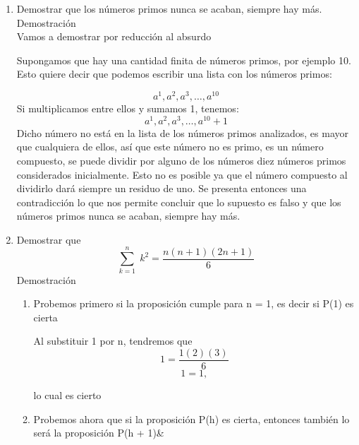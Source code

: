 \documentclass{article}
\begin{document}
\begin {enumerate}
Demostración

Vamos a demostrar por reducción al absurdo
\\ 

Supongamos que un peón puede moverse 7 pasos como mínimo en el juego. Esto haría que el juego tenga 9 filas como mínimo.
Sabemos que el tablero tiene 8 filas, entonces, se presenta una contradicción, es decir, que lo supuesto es falso; es decir, un peón puede moverse a lo sumo seis pasos
\item
Demostrar que los números primos  nunca se acaban, siempre hay más.
\\ 

Demostración
\\ 

Vamos a demostrar por reducción al absurdo

Supongamos que hay una cantidad finita de números primos, por ejemplo 10. Esto quiere decir que podemos escribir una lista con los números primos: 

$$a^1, a^2, a^3,, a^{10}$$
Si multiplicamos entre ellos y sumamos 1, tenemos: 
$$a^1, a^2, a^3,, a^10 + 1$$
Dicho número no está en la lista de los números primos analizados, es mayor que cualquiera de ellos, así que este número no es primo, es un número compuesto, se puede dividir por alguno de los números diez números primos considerados inicialmente.  Esto no es
posible ya que el número compuesto al  dividirlo dará siempre un residuo de uno. Se presenta entonces una contradicción lo que nos permite concluir que lo supuesto es falso y que los números primos nunca se acaban, siempre hay más.
\item
Demostrar que 
\begin {equation}
\label {pregunta 30 ec 7}
\displaystyle \sum_{k=1}^{n} \; k^2 = \frac{n(n+1)(2n+1)}{6}
\end{equation}
Demostración
\begin {enumerate}
\item
Probemos primero si la proposición cumple para n = 1, es decir si P(1) es cierta

Al substituir 1 por n, tendremos que
$$1 = \frac{1(2)(3)}{6}$$
$$1 = 1, $$

lo cual es cierto 
\item
Probemos ahora que si la proposición P(h) es cierta, entonces también lo será la proposición P(h + 1)\&
\\ 


\end{enumerate}
\end{enumerate}
\end{document}

